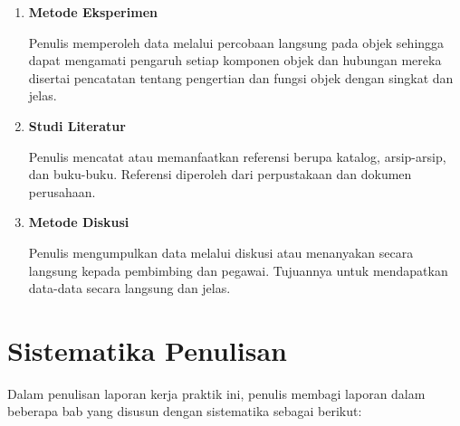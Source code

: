 \begin{enumerate}[nolistsep]

  \item \textbf{Metode Eksperimen}
  \vspace{0.5ex}

  Penulis memperoleh data melalui percobaan langsung pada objek sehingga dapat mengamati pengaruh setiap komponen objek dan hubungan mereka disertai pencatatan tentang pengertian dan fungsi objek dengan singkat dan jelas.
  \vspace{0.5ex}

  \item \textbf{Studi Literatur}
  \vspace{0.5ex}

  Penulis mencatat atau memanfaatkan referensi berupa katalog, arsip-arsip, dan buku-buku. Referensi diperoleh dari perpustakaan dan dokumen perusahaan.
  \vspace{0.5ex}

  \item \textbf{Metode Diskusi}
  \vspace{0.5ex}

  Penulis mengumpulkan data melalui diskusi atau menanyakan secara langsung kepada pembimbing dan pegawai.
  Tujuannya untuk mendapatkan data-data secara langsung dan jelas.
  \vspace{0.5ex}

\end{enumerate}
\vspace{0.5ex}

\section{Sistematika Penulisan}
\vspace{1ex}

Dalam penulisan laporan kerja praktik ini, penulis membagi laporan dalam beberapa bab yang disusun dengan sistematika sebagai berikut:
\vspace{0.5ex}

